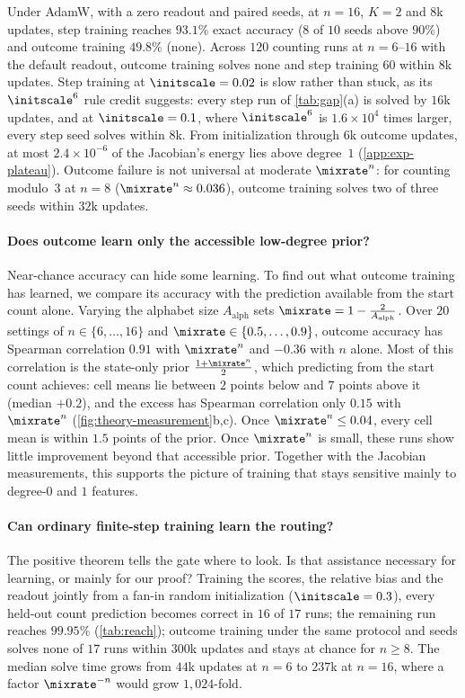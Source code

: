 Under AdamW, with a zero readout and paired seeds, at $n=16$, $K=2$ and $8$k updates, step training reaches
$93.1\%$ exact accuracy ($8$ of $10$ seeds above $90\%$) and outcome training $49.8\%$ (none). Across $120$ counting runs at
$n=6$--$16$ with the default readout, outcome training solves none and step training $60$ within $8$k updates. Step
training at $\initscale=0.02$ is slow rather than stuck, as its $\initscale^6$ rule credit suggests: every step run of
\cref{tab:gap}(a) is solved by $16$k updates, and at $\initscale=0.1$, where $\initscale^6$ is $1.6\times10^4$ times larger, every
step seed solves within $8$k. From initialization through $6$k outcome updates, at most $2.4\times10^{-6}$ of the Jacobian's
energy lies above degree~$1$ (\cref{app:exp-plateau}). Outcome failure is not universal at moderate $\mixrate^n$: for counting
modulo~$3$ at $n=8$ ($\mixrate^n\approx0.036$), outcome training solves two of three seeds within $32$k updates.

\paragraph{Does outcome learn only the accessible low-degree prior?} Near-chance accuracy can hide some learning. To find out what
outcome training has learned, we compare its accuracy with the prediction available from the start count alone. Varying the alphabet size $A_{\mathrm{alph}}$ sets $\mixrate=1-\frac{2}{A_{\mathrm{alph}}}$. Over $20$ settings
of $n\in\{6,\ldots,16\}$ and $\mixrate\in\{0.5,\ldots,0.9\}$, outcome accuracy has Spearman correlation $0.91$ with
$\mixrate^n$ and $-0.36$ with $n$ alone. Most of this correlation is the state-only prior $\frac{1+\mixrate^n}{2}$, which predicting
from the start count achieves: cell means lie between $2$ points below and $7$ points above it (median $+0.2$), and the excess
has Spearman correlation only $0.15$ with $\mixrate^n$ (\cref{fig:theory-measurement}b,c). Once $\mixrate^n\le0.04$, every
cell mean is within $1.5$ points of the prior. Once $\mixrate^n$ is small, these runs show little improvement beyond that accessible prior. Together with the Jacobian measurements,
this supports the picture of training that stays sensitive mainly to degree-$0$ and $1$ features.

\paragraph{Can ordinary finite-step training learn the routing?} The positive theorem tells the gate where to look. Is that assistance
necessary for learning, or mainly for our proof? Training the scores, the relative bias and the readout jointly from a fan-in
random initialization ($\initscale=0.3$), every held-out count prediction becomes correct in $16$ of $17$ runs; the
remaining run reaches $99.95\%$ (\cref{tab:reach}); outcome training under the same protocol and seeds solves none of $17$
runs within $300$k updates and stays at chance for $n\ge8$. The median solve time grows from $44$k updates at $n=6$ to $237$k at
$n=16$, where a factor $\mixrate^{-n}$ would grow $1{,}024$-fold.

